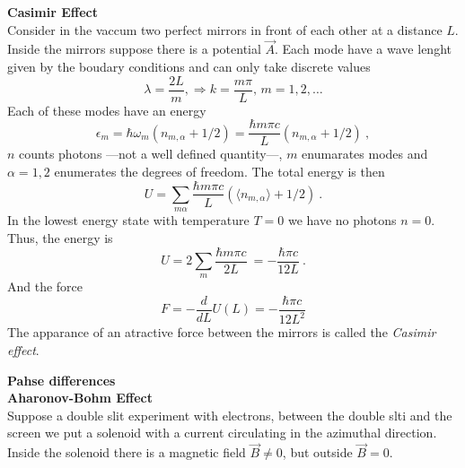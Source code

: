 \documentclass[12pt,a4paper]{article}
\begin{document}
\textbf{Casimir Effect}\\
Consider in the vaccum two perfect mirrors in front of each other at a distance $L$. Inside the mirrors suppose there is a potential $\vec{A}$. Each mode have a wave lenght given by the boudary conditions and can only take discrete values
\begin{equation}
	\lambda = \frac{2L}{m}, \Rightarrow k =\frac{m \pi}{L}, \, m = 1,2,\dots
\end{equation}
Each of these modes have an energy
\begin{equation}
	\epsilon_m = \hbar \omega_m (n_{m,\alpha} + 1/2) = \frac{\hbar m\pi c}{L} (n_{m,\alpha} + 1/2)\ ,
\end{equation}
$n$ counts photons ---not a well defined quantity---, $m$ enumarates modes and $\alpha =1,2$ enumerates the degrees of freedom. The total energy is then
\begin{equation}
	U = \sum_{m\alpha} \frac{\hbar m\pi c}{L}(\langle n_{m,\alpha}\rangle + 1/2) \ .
\end{equation}
In the lowest energy state with temperature $T = 0$ we have no photons $n = 0$. Thus, the energy is
\begin{equation}
	U = 2\sum_ m  \frac{\hbar m\pi c}{2L} \ = -\frac{\hbar \pi c}{12 L} \ .
\end{equation}
And the force
\begin{equation}
	F = -\frac{d}{dL} U (L) = - \frac{\hbar \pi c}{12L^2}
\end{equation}
The apparance of an atractive force between the mirrors is called the \textit{Casimir effect}.

\textbf{Pahse differences}\\

\textbf{Aharonov-Bohm Effect}\\
Suppose a double slit experiment with electrons, between the double slti and the screen we put a solenoid with a current circulating in the azimuthal direction. Inside the solenoid there is a magnetic field $\vec{B} \neq 0$, but outside $\vec{B} = 0$.
\end{document}
